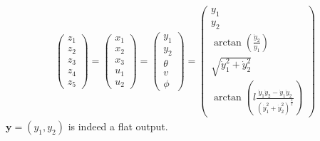 \documentclass[a4paper,11pt,headings=standardclasses]{scrartcl}%
\newcommand{\y}{\mathbf{y}}
\begin{document}
\begin{align}
\begin{pmatrix} z_1 \\ z_2 \\ z_3 \\ z_4 \\ z_5 \end{pmatrix} = 
\begin{pmatrix} x_1 \\ x_2 \\ x_3 \\ u_1 \\ u_2 \end{pmatrix} = 
\begin{pmatrix} y_1 \\ y_2 \\ \theta \\v \\  \phi \end{pmatrix} =
\begin{pmatrix} y_1 \\ y_2 \\  \arctan\left(\frac{\dot{y}_2}{\dot{y}_1}\right)\\ \sqrt{\dot{y}_1^2+\dot{y}_2^2}\\ \arctan\left(l \frac{\ddot{y}_1 \dot{y}_2 - \dot{y}_1 \ddot{y}_2}{(\dot{y}_1^2+\dot{y}_2^2)^{\frac{3}{2}}} 
\right) \end{pmatrix}
\end{align}
$\y = (y_1, y_2)$ is indeed a flat output.
\end{document}
